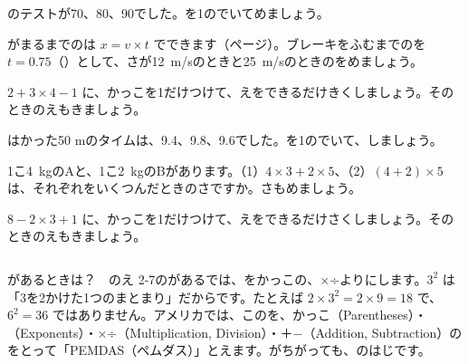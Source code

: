 \bkproblem {}のテストが70、80、90でした。を1のでいてめましょう。



\bkproblem {}がまるまでのは $x=v\times t$ でできます（\pageref{bk:2-11:butsuri}ページ）。ブレーキをふむまでのを $t=0.75$（）として、さが\qty{12}{m/s}のときと\qty{25}{m/s}のときのをめましょう。

\bkproblem $2+3\times4-1$ に、かっこを1だけつけて、えをできるだけきくしましょう。そのときのえもきましょう。

はかった50 mのタイムは、9.4、9.8、9.6でした。を1のでいて、しましょう。
\begin{bkcenter}
\end{bkcenter}

\bkproblem 1こ\qty{4}{kg}のAと、1こ\qty{2}{kg}のBがあります。（1）$4\times3+2\times5$、（2）$(4+2)\times5$ は、それぞれをいくつんだときのさですか。さもめましょう。

\bkproblem $8-2\times3+1$ に、かっこを1だけつけて、えをできるだけさくしましょう。そのときのえもきましょう。

\begin{column}{があるときは？　のえ}
2-7のがあるでは、をかっこの、×÷よりにします。$3^2$ は「3を2かけた1つのまとまり」だからです。たとえば $2\times3^2=2\times9=18$ で、$6^2=36$ ではありません。アメリカでは、このを、かっこ（Parentheses）・（Exponents）・×÷（Multiplication, Division）・＋−（Addition, Subtraction）のをとって「PEMDAS（ペムダス）」とえます。がちがっても、のはじです。
\end{column}


